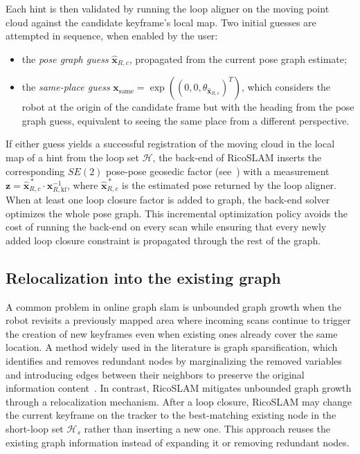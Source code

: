 Each hint is then validated by running the loop aligner on the
moving point cloud against the candidate keyframe's local map.
Two initial guesses are attempted in sequence, when enabled by the user:
\begin{itemize}[nosep]
\item the \emph{pose graph guess}
$\hat{\mathbf{x}}_{R,c}$, propagated from the current pose graph estimate;
\item the \emph{same-place guess}
$\mathbf{x}_{\mathrm{same}} = \exp\!\left((0, 0, \theta_{\hat{\mathbf{x}}_{R,c}})^T\right)$,
which considers the robot at the origin of the candidate frame but with
the heading from the pose graph guess, equivalent to seeing the same place
from a different perspective.
\end{itemize}
If either guess yields a successful registration of the moving cloud in
the local map of a hint from the loop set $\mathcal{H}$,
the back-end of RicoSLAM inserts the corresponding $SE(2)$ pose-pose geosedic
factor (see~) with a measurement
$\mathbf{z} = \hat{\mathbf{x}}_{R,c}^{\,*} \cdot
\mathbf{x}_{R,\mathrm{kf}}^{-1}$, where $\hat{\mathbf{x}}_{R,c}^{\,*}$ is
the estimated pose returned by the loop aligner.
When at least one loop closure factor is added to graph, the
back-end solver optimizes the whole pose graph.
This incremental optimization policy avoids the cost of running the
back-end on every scan while ensuring that every newly added loop closure
constraint is propagated through the rest of the graph.

\subsection{Relocalization into the existing graph}
\label{sec:slam:online:relocalization}

A common problem in online graph \gls{slam} is unbounded graph growth when
the robot revisits a previously mapped area where incoming scans continue
to trigger the creation of new keyframes even when existing ones
already cover the same location. A method widely used in
the literature is graph sparsification, which identifies and removes
redundant nodes by marginalizing the removed variables and
introducing edges between their neighbors to preserve
the original information content~\cite{sousa:jfr:2023}.
In contrast, RicoSLAM mitigates unbounded graph growth through
a relocalization mechanism. After a loop closure, RicoSLAM may change
the current keyframe on the tracker to the best-matching existing node
in the short-loop set $\mathcal{H}_s$ rather than inserting a new one.
This approach reuses the existing graph information
instead of expanding it or removing redundant nodes.

